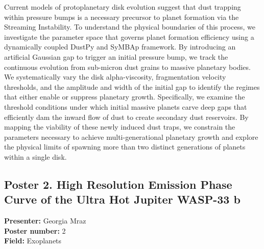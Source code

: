 Current models of protoplanetary disk evolution suggest that dust trapping within pressure bumps is a necessary precursor to planet formation via the Streaming Instability. To understand the physical boundaries of this process, we investigate the parameter space that governs planet formation efficiency using a dynamically coupled DustPy and SyMBAp framework. By introducing an artificial Gaussian gap to trigger an initial pressure bump, we track the continuous evolution from sub-micron dust grains to massive planetary bodies. We systematically vary the disk alpha-viscosity, fragmentation velocity thresholds, and the amplitude and width of the initial gap to identify the regimes that either enable or suppress planetary growth. Specifically, we examine the threshold conditions under which initial massive planets carve deep gaps that efficiently dam the inward flow of dust to create secondary dust reservoirs. By mapping the viability of these newly induced dust traps, we constrain the parameters necessary to achieve multi-generational planetary growth and explore the physical limits of spawning more than two distinct generations of planets within a single disk.

\hypertarget{poster-abstract-talk-221}{}\label{poster-abstract-page-talk-221}
\subsection*{Poster 2. High Resolution Emission Phase Curve of the Ultra Hot Jupiter WASP-33 b}
\textbf{Presenter:} Georgia Mraz\\
\textbf{Poster number:} 2\\
\textbf{Field:} Exoplanets

